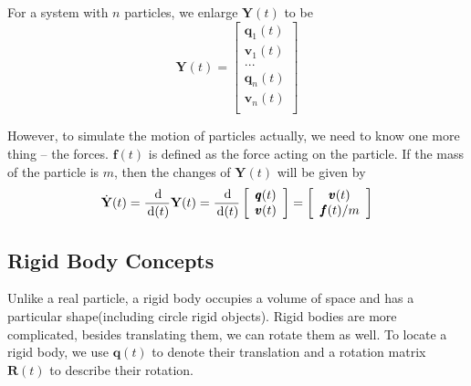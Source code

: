 For a system with $n$ particles, we enlarge $\textbf{Y}(t)$ to be
\begin{equation}
    \textbf{Y}(t) = \left[
    \begin{array}{c}
        \pmb{q}_{1}(t) \\
        \pmb{v}_{1}(t) \\
        ... \\
        \pmb{q}_{n}(t) \\
        \pmb{v}_{n}(t) \\
    \end{array}
    \right]
\end{equation}

However, to simulate the motion of particles actually, we need to know one more thing -- the forces. $\pmb{f}(t)$ is defined as the force acting on the particle. If the mass of the particle is $m$, then the changes of $\textbf{Y}(t)$ will be given by
\begin{equation}
    \dot{\mathbf{Y}}(t) = \frac{\,\mathrm{d}}{\,\mathrm{d}(t)}\textbf{Y}(t) = \frac{\,\mathrm{d}}{\,\mathrm{d}(t)}\left[
        \begin{array}{c}
            \pmb{q}(t) \\
            \pmb{v}(t) \\
        \end{array} \right] = \left[
        \begin{array}{c}
            \pmb{v}(t) \\
            \pmb{f}(t)/m \\
        \end{array} \right]
\end{equation}

\subsection{Rigid Body Concepts}
Unlike a real particle, a rigid body occupies a volume of space and has a particular shape(including circle rigid objects). Rigid bodies are more complicated, besides translating them, we can rotate them as well. To locate a rigid body, we use $\pmb{q}(t)$ to denote their translation and a rotation matrix $\pmb{R}(t)$ to describe their rotation.


